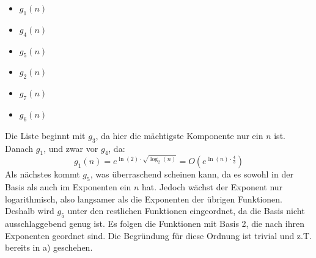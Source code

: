 \documentclass[a4paper,11pt]{article}
\begin{document}
\begin{enumerate}
\begin{enumerate}
\begin{itemize}
                            \item $g_1(n)$\\
                            \item $g_4(n)$\\
                            \item $g_5(n)$\\
                            \item $g_2(n)$\\
                            \item $g_7(n)$\\
                            \item $g_6(n)$\\
                        \end{itemize}
                        Die Liste beginnt mit $g_3$, da hier die mächtigste Komponente
                        nur ein $n$ ist. Danach $g_1$, und zwar vor $g_4$, da:
                        \[ g_1(n)=e^{\ln(2) \cdot \sqrt{\log_2(n)}}=O(e^{\ln(n) \cdot \frac{4}{3}}) \]
                        Als nächstes kommt $g_5$, was überraschend scheinen kann, da es sowohl
                        in der Basis als auch im Exponenten ein $n$ hat. Jedoch
                        wächst der Exponent nur logarithmisch, also langsamer
                        als die Exponenten der übrigen Funktionen. Deshalb 
                        wird $g_5$ unter den restlichen Funktionen eingeordnet,
                        da die Basis nicht ausschlaggebend genug ist.
                        Es folgen die Funktionen mit Basis 2, die nach 
                        ihren Exponenten geordnet sind. Die Begründung für diese
                        Ordnung ist trivial und z.T. bereits in a) geschehen.
                \end{enumerate}


\end{enumerate}
\end{document}
